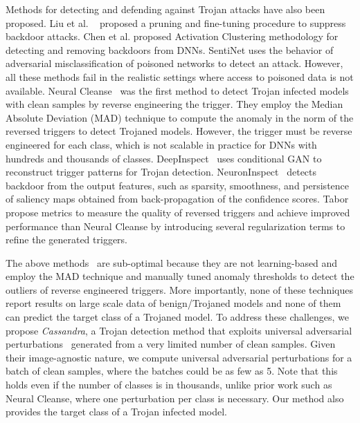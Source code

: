 \documentclass{article}
\begin{document}
Methods for detecting and defending against Trojan attacks have also been proposed. Liu et al. ~\cite{liu2018fine} proposed a pruning and fine-tuning procedure to suppress backdoor attacks.  Chen et al. \cite{chen2018detecting} proposed Activation Clustering methodology for detecting and removing backdoors from DNNs. SentiNet\cite{chou2018sentinet} uses the behavior of adversarial misclassification of poisoned networks to detect an attack. However, all these methods fail in the realistic settings where access to poisoned data is not available.
Neural Cleanse~\cite{wang2019neural} was the first  method to detect Trojan infected models with clean samples by reverse engineering the trigger. They employ the Median Absolute Deviation (MAD) technique to  compute the anomaly in the  norm of the reversed triggers to detect Trojaned models. However,  the trigger must be reverse engineered  for each class, which is not scalable in practice for DNNs with hundreds and thousands of classes.  DeepInspect~\cite{chen2019deepinspect} uses conditional GAN to reconstruct trigger patterns for Trojan detection.
NeuronInspect~\cite{huang2019neuroninspect} detects backdoor from the output features, such as sparsity, smoothness, and persistence of saliency maps obtained from back-propagation of the confidence scores. 
 Tabor~\cite{guo2019tabor} propose metrics to measure the quality of reversed triggers  and achieve improved performance than Neural Cleanse by introducing several regularization terms to refine the generated triggers. 


The above methods~\cite{wang2019neural,chen2019deepinspect,huang2019neuroninspect} 
are sub-optimal because they are not learning-based and employ the MAD technique and manually tuned anomaly thresholds to detect the outliers of reverse engineered triggers. More importantly, none of these techniques report results on large scale data of benign/Trojaned models and none of them can predict the target class of a Trojaned model. To address these challenges, we propose {\it Cassandra}, a Trojan detection method that exploits universal adversarial perturbations~\cite{Khrulkov_2018_CVPR} generated from a very limited number of clean samples. Given their image-agnostic nature, we compute universal adversarial perturbations for a batch of clean samples, where the batches could be as few as 5. Note that this holds even if the number of classes is in thousands, unlike prior work such as Neural Cleanse, where one perturbation per class is necessary. Our method also provides the target class of a Trojan infected model.
\end{document}
